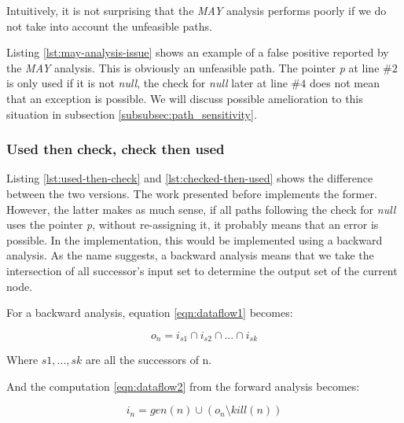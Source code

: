 Intuitively, it is not surprising that the \emph{MAY} analysis performs poorly if we do not take into account the unfeasible paths.



Listing \ref{lst:may-analysis-issue} shows an example of a false positive reported by the \emph{MAY} analysis. 
This is obviously an unfeasible path.
The pointer \emph{p} at line $\#2$ is only used if it is not \emph{null}, the check for \emph{null} later at line $\#4$ does not mean that an exception is possible.
We will discuss possible amelioration to this situation in subsection \ref{subsubsec:path_sensitivity}.

\subsubsection{Used then check, check then used}
\label{subsubsec:used_then_check_check_then_used}




Listing \ref{lst:used-then-check} and \ref{lst:checked-then-used} shows the difference between the two versions.
The work presented before implements the former.
However, the latter makes as much sense, if all paths following the check for \emph{null} uses the pointer \emph{p}, without re-assigning it, it probably means that an error is possible.
In the implementation, this would be implemented using a backward analysis. 
As the name suggests, a backward analysis means that we take the intersection of all successor’s input set to determine the output set of the current node. 
\pagebreak

For a backward analysis, equation \eqref{eqn:dataflow1} becomes:

\begin{equation}\label{eqn:checkthenused1}
o_{n} = i_{s1}  \cap   i_{s2}  \cap  ... \cap   i_{sk}
\end{equation}

Where $s1, ..., sk$ are all the successors of n.

And the computation \eqref{eqn:dataflow2} from the forward analysis becomes:

\begin{equation}\label{eqn:checkthenused2}
i_{n} = gen(n)  \cup   (o_{n} \setminus kill(n))
\end{equation}

